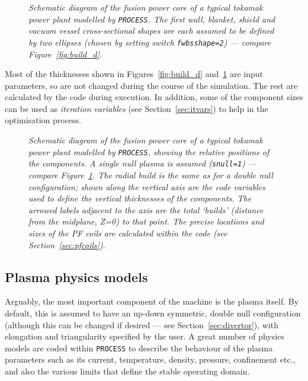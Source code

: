 \documentclass[11pt,a4paper]{report}
\newcommand{\process}{\mbox{\texttt{PROCESS}}}
\begin{document}
\begin{figure}[tbph]
\caption[Machine build for elliptical-shaped major components]
{\label{fig:build_e} \textit{Schematic diagram of the fusion
    power core of a typical tokamak power plant modelled by \process. The
    first wall, blanket, shield and vacuum vessel cross-sectional shapes are
    each assumed to be defined by two ellipses (chosen by setting switch
    \texttt{fwbsshape=2}) --- compare Figure~\ref{fig:build_d}.}  }
\end{figure}

Most of the thicknesses shown in Figures~\ref{fig:build_d} and~\ref{fig:build_e}
are input parameters, so are not changed during the course of the simulation.
The rest are calculated by the code during execution. In addition, some of the
component sizes can be used as \textit{iteration variables}\/ (see
Section~\ref{sec:itvars}) to help in the optimisation process.

\begin{figure}[tbph]
\caption[Machine build for a single-null device]
{\label{fig:buildsnd}
  \textit{Schematic diagram of the fusion power core of a typical tokamak
    power plant modelled by \process, showing the relative positions of the
    components. A single null plasma is assumed (\texttt{snull=1}) --- compare
    Figure~\ref{fig:build_e}. The radial build is the same as for a double null
    configuration; shown along the vertical axis are the code variables used
    to define the vertical thicknesses of the components. The arrowed labels
    adjacent to the axis are the total `builds' (distance from the midplane,
    Z=0) to that point. The precise locations and sizes of the  PF coils are
    calculated within the code (see Section~\ref{sec:pfcoils}).}
}
\end{figure}

\subsection{Plasma physics models}

Arguably, the most important component of the machine is the plasma itself. By
default, this is assumed to have an up-down symmetric, double null
configuration (although this can be changed if desired --- see
Section~\ref{sec:divertor}), with elongation and triangularity specified by
the user. A great number of physics models are coded within \process\/ to
describe the behaviour of the plasma parameters such as its current,
temperature, density, pressure, confinement etc., and also the various limits
that define the stable operating domain.
\end{document}
